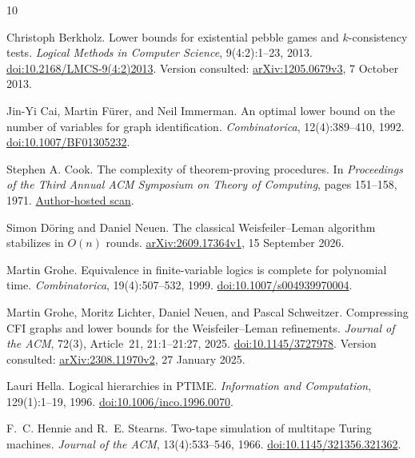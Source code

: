 \begin{thebibliography}{10}

Christoph Berkholz.
\newblock Lower bounds for existential pebble games and
$k$-consistency tests.
\newblock \emph{Logical Methods in Computer Science}, 9(4:2):1--23, 2013.
\newblock
\href{https://doi.org/10.2168/LMCS-9(4:2)2013}{doi:10.2168/LMCS-9(4:2)2013}.
\newblock Version consulted:
\href{https://arxiv.org/abs/1205.0679v3}{arXiv:1205.0679v3},
7 October 2013.

Jin-Yi Cai, Martin F\"urer, and Neil Immerman.
\newblock An optimal lower bound on the number of variables for graph identification.
\newblock \emph{Combinatorica}, 12(4):389--410, 1992.
\newblock \href{https://doi.org/10.1007/BF01305232}{doi:10.1007/BF01305232}.

Stephen A. Cook.
\newblock The complexity of theorem-proving procedures.
\newblock In \emph{Proceedings of the Third Annual ACM Symposium on
Theory of Computing}, pages 151--158, 1971.
\newblock \href{https://www.cs.utoronto.ca/~sacook/homepage/1971.pdf}{Author-hosted scan}.

Simon D\"oring and Daniel Neuen.
\newblock The classical Weisfeiler--Leman algorithm stabilizes in $O(n)$ rounds.
\newblock \href{https://arxiv.org/abs/2609.17364v1}{arXiv:2609.17364v1},
15 September 2026.

Martin Grohe.
\newblock Equivalence in finite-variable logics is complete for polynomial time.
\newblock \emph{Combinatorica}, 19(4):507--532, 1999.
\newblock \href{https://doi.org/10.1007/s004939970004}{doi:10.1007/s004939970004}.

Martin Grohe, Moritz Lichter, Daniel Neuen, and Pascal Schweitzer.
\newblock Compressing CFI graphs and lower bounds for the
Weisfeiler--Leman refinements.
\newblock \emph{Journal of the ACM}, 72(3), Article~21, 21:1--21:27, 2025.
\newblock \href{https://doi.org/10.1145/3727978}{doi:10.1145/3727978}.
\newblock Version consulted:
\href{https://arxiv.org/abs/2308.11970v2}{arXiv:2308.11970v2},
27 January 2025.

Lauri Hella.
\newblock Logical hierarchies in PTIME.
\newblock \emph{Information and Computation}, 129(1):1--19, 1996.
\newblock \href{https://doi.org/10.1006/inco.1996.0070}{doi:10.1006/inco.1996.0070}.

F.~C. Hennie and R.~E. Stearns.
\newblock Two-tape simulation of multitape Turing machines.
\newblock \emph{Journal of the ACM}, 13(4):533--546, 1966.
\newblock \href{https://doi.org/10.1145/321356.321362}{doi:10.1145/321356.321362}.


\end{thebibliography}
